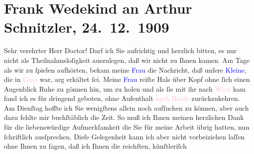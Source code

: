 

               \section[Frank Wedekind an Arthur Schnitzler, 24. 12. 1909]{ Frank Wedekind an Arthur Schnitzler, 24. 12. 1909}\nopagebreak{}\rehead{ }\normalsize\beginnumbering{} \toendnotes[C]{\smallbreak\pagebreak[2]} 
\toendnotes[C]{\smallbreak}\pstart{}{\pb}Sehr verehrter Herr Doctor!\pend\pstart
           Darf ich Sie aufrichtig und herzlich bitten, es nur nicht als Theilnahmsloſigkeit
               auszulegen, daß wir nicht zu Ihnen kamen. Am Tage als wir zu ſpielen aufhörten, bekam
               meine \textcolor{blue}{Frau}{} die Nachricht, daß
               unſere \textcolor{blue}{Kleine}{}, die in \textcolor{pink}{Graz}{}\ledrightnote{\textcolor{pink}{Graz}} war, arg erkältet ſei. {\pb}Meine \textcolor{blue}{Frau}{} reiſte Hals über Kopf ohne ſich einen Augenblick Ruhe
               zu gönnen hin, um \label{T_L01909_1v}\label{T_L01909_1h} zu holen
               und als ſie mit ihr nach \textcolor{pink}{Wien}{}\ledrightnote{\textcolor{pink}{Wien}} kam fand ich es für
               dringend geboten, ohne Aufenthalt \textcolor{pink}{nach Hauſe}{} zurückzukehren. Am Dienſtag hoffte ich Sie
               wenigſtens allein noch aufſuchen zu können, aber auch dazu fehlte mir buchſtäblich
               die Zeit. So muß ich Ihnen meinen herzlichen Dank für die liebenswürdige
               Aufmerkſamkeit {\pb}die Sie für meine Arbeit
               übrig hatten, nun ſchriftlich ausſprechen. Dieſe Gelegenheit kann ich aber nicht
               vorbeiziehen laſſen ohne Ihnen zu ſagen, daß ich Ihnen die reichſten, künſtleriſch
